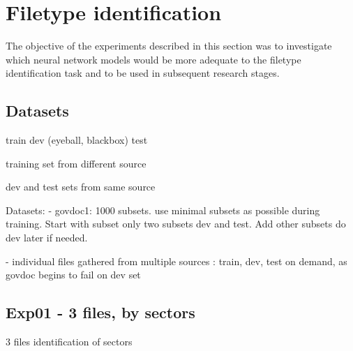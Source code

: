 \section{Filetype identification}
The objective of the experiments described in this section was to investigate which neural network models would be more adequate to the filetype identification task and to be used in subsequent research stages.
\subsection{Datasets}







train
dev (eyeball, blackbox)
test

training set from different source

dev and test sets from same source

Datasets:
- govdoc1: 1000 subsets. use minimal subsets as possible during training.
Start with subset only two subsets dev and test. Add other subsets do dev later if needed.

- individual files gathered from multiple sources : train, dev, test
on demand, as govdoc begins to fail on dev set




\subsection{Exp01 - 3 files, by sectors}
3 files
identification of sectors
